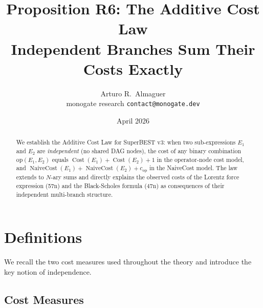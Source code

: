 \documentclass[12pt,a4paper]{article}
\title{Proposition R6: The Additive Cost Law\\[6pt]
       \large Independent Branches Sum Their Costs Exactly}
\author{Arturo R.\ Almaguer\\
\small monogate research \quad \texttt{contact@monogate.dev}}
\date{April 2026}
\theoremstyle{definition}
\newcommand{\Cost}{\operatorname{Cost}}
\newcommand{\NC}{\operatorname{NaiveCost}}
\begin{document}
\maketitle

\begin{abstract}
We establish the Additive Cost Law for SuperBEST v3: when two sub-expressions
$E_1$ and $E_2$ are \emph{independent} (no shared DAG nodes), the cost of any
binary combination $\mathrm{op}(E_1, E_2)$ equals
$\Cost(E_1) + \Cost(E_2) + 1$ in the operator-node cost model, and
$\NC(E_1) + \NC(E_2) + c_{\mathrm{op}}$ in the NaiveCost model.
The law extends to $N$-ary sums and directly explains the observed costs of the
Lorentz force expression (57n) and the Black-Scholes formula (47n) as
consequences of their independent multi-branch structure.
\end{abstract}

\tableofcontents
\bigskip

\section{Definitions}
\label{sec:defs}

We recall the two cost measures used throughout the theory and introduce the
key notion of independence.

\subsection{Cost Measures}
\end{document}

